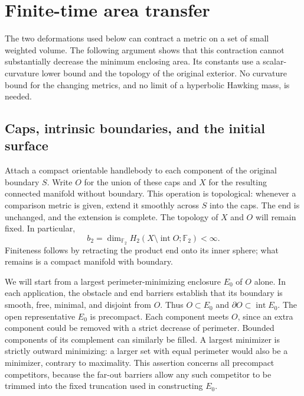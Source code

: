 \section{Finite-time area transfer}\label{sec:area-transfer}

The two deformations used below can contract a metric on a set of small
weighted volume.  The following argument shows that this contraction
cannot substantially decrease the minimum enclosing area.  Its constants
use a scalar-curvature lower bound and the topology of the original
exterior.  No curvature bound for the changing metrics, and no limit of a
hyperbolic Hawking mass, is needed.

\subsection{Caps, intrinsic boundaries, and the initial surface}

Attach a compact orientable handlebody to each component of the original
boundary $S$.  Write $O$ for the union of these caps and $X$ for the
resulting connected manifold without boundary.  This operation is
topological: whenever a comparison metric is given, extend it smoothly
across $S$ into the caps.  The end is unchanged, and the extension is
complete.  The topology of $X$ and $O$ will remain fixed.  In particular,
\begin{equation}\label{eq:flow-topology-constant}
 b_2=\dim_{\mathbb F_2}H_2(X\setminus\operatorname{int}O;\mathbb F_2)<\infty.
\end{equation}
Finiteness follows by retracting the product end onto its inner sphere;
what remains is a compact manifold with boundary.

We will start from a largest perimeter-minimizing enclosure $E_0$ of
$O$ alone.  In each application, the obstacle and end barriers establish
that its boundary is smooth, free, minimal, and disjoint from $O$.
Thus $O\subset E_0$ and $\partial O\subset\operatorname{int}E_0$.
The open representative $E_0$ is precompact.  Each component meets $O$,
since an extra component could be removed with a strict decrease of
perimeter.  Bounded components of its complement can similarly be
filled.  A largest minimizer is strictly outward minimizing: a larger
set with equal perimeter would also be a minimizer, contrary to
maximality.  This assertion concerns all precompact competitors, because
the far-out barriers allow any such competitor to be trimmed into the
fixed truncation used in constructing $E_0$.

